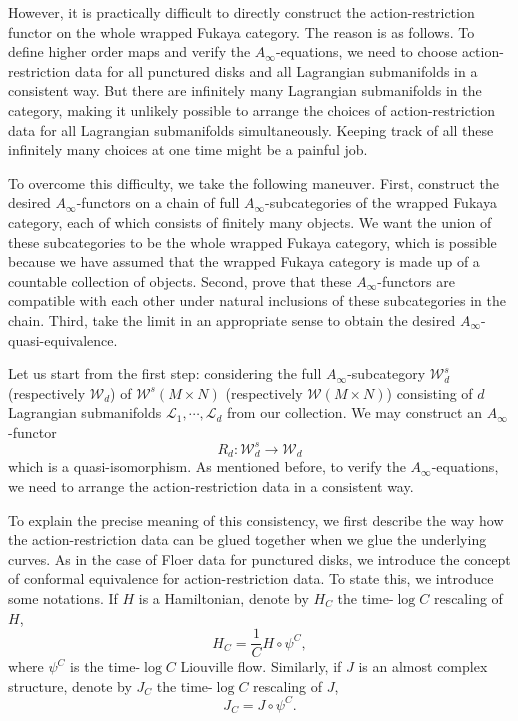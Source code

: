 \documentclass{amsart}
\numberwithin{equation}{section}
\numberwithin{figure}{section}
\begin{document}
	However, it is practically difficult to directly construct the action-restriction functor on the whole wrapped Fukaya category. The reason is as follows. To define higher order maps and verify the $A_{\infty}$-equations, we need to choose action-restriction data for all punctured disks and all Lagrangian submanifolds in a consistent way. But there are infinitely many Lagrangian submanifolds in the category, making it unlikely possible to arrange the choices of action-restriction data for all Lagrangian submanifolds simultaneously. Keeping track of all these infinitely many choices at one time might be a painful job. \par
	To overcome this difficulty, we take the following maneuver. First, construct the desired $A_{\infty}$-functors on a chain of full $A_{\infty}$-subcategories of the wrapped Fukaya category, each of which consists of finitely many objects. We want the union of these subcategories to be the whole wrapped Fukaya category, which is possible because we have assumed that the wrapped Fukaya category is made up of a countable collection of objects. Second, prove that these $A_{\infty}$-functors are compatible with each other under natural inclusions of these subcategories in the chain. Third, take the limit in an appropriate sense to obtain the desired $A_{\infty}$-quasi-equivalence. \par
	Let us start from the first step: considering the full $A_{\infty}$-subcategory $\mathcal{W}_{d}^{s}$ (respectively $\mathcal{W}_{d}$) of $\mathcal{W}^{s}(M \times N)$ (respectively $\mathcal{W}(M \times N)$) consisting of $d$ Lagrangian submanifolds $\mathcal{L}_{1}, \cdots, \mathcal{L}_{d}$ from our collection. We may construct an $A_{\infty}$-functor
\begin{equation}
R_{d}: \mathcal{W}_{d}^{s} \to \mathcal{W}_{d}
\end{equation}
which is a quasi-isomorphism. As mentioned before, to verify the $A_{\infty}$-equations, we need to arrange the action-restriction data in a consistent way. \par
	To explain the precise meaning of this consistency, we first describe the way how the action-restriction data can be glued together when we glue the underlying curves. As in the case of Floer data for punctured disks, we introduce the concept of conformal equivalence for action-restriction data. To state this, we introduce some notations. If $H$ is a Hamiltonian, denote by $H_{C}$ the time-$\log C$ rescaling of $H$,
\begin{equation*}
H_{C} = \frac{1}{C} H \circ \psi^{C},
\end{equation*}
where $\psi^{C}$ is the time-$\log C$ Liouville flow. Similarly, if $J$ is an almost complex structure, denote by $J_{C}$ the time-$\log C$ rescaling of $J$,
\begin{equation*}
J_{C} = J \circ \psi^{C}.
\end{equation*}
\end{document}
